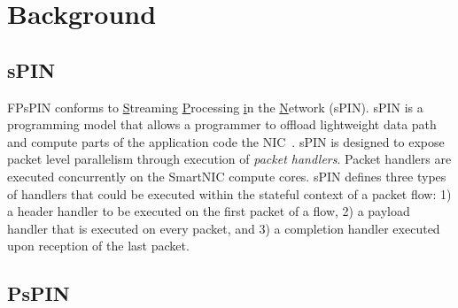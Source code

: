 \chapter{Background}

\section{sPIN}
FPsPIN conforms to \underline{S}treaming \underline{P}rocessing \underline{i}n the \underline{N}etwork (sPIN). sPIN is a programming model that allows a programmer to offload lightweight data path and compute parts of the application code the NIC~\cite{hoefler2017spin}. sPIN is designed to expose packet level parallelism through execution of \textit{packet handlers}. Packet handlers are executed concurrently on the SmartNIC compute cores. sPIN defines three types of handlers that could be executed within the stateful context of a packet flow: 1) a header handler to be executed on the first packet of a flow, 2) a payload handler that is executed on every packet, and 3) a completion handler executed upon reception of the last packet.

\section{PsPIN} \label{sec:background-pspin}

\begin{table}[ht!]
\caption{Near linear scaling of the total cluster area ($8\times$ cores per cluster) compared to the per-packet time budget at $400$Gbit/s. The total area is estimated using synthesis of PsPIN in $22$nm@$1$GHz.}
\label{tab:cost_model}
\vspace{-0.9em}
\end{table}

